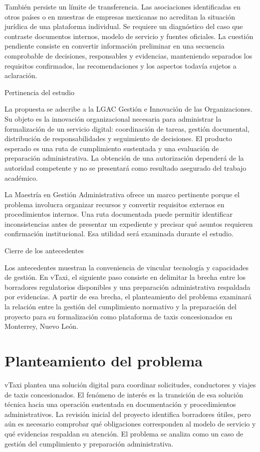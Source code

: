 {También persiste un límite de transferencia. Las asociaciones identificadas en otros países o en muestras de empresas mexicanas no acreditan la situación jurídica de una plataforma individual. Se requiere un diagnóstico del caso que contraste documentos internos, modelo de servicio y fuentes oficiales. La cuestión pendiente consiste en convertir información preliminar en una secuencia comprobable de decisiones, responsables y evidencias, manteniendo separados los requisitos confirmados, las recomendaciones y los aspectos todavía sujetos a aclaración.


Pertinencia del estudio


La propuesta se adscribe a la LGAC Gestión e Innovación de las Organizaciones. Su objeto es la innovación organizacional necesaria para administrar la formalización de un servicio digital: coordinación de tareas, gestión documental, distribución de responsabilidades y seguimiento de decisiones. El producto esperado es una ruta de cumplimiento sustentada y una evaluación de preparación administrativa. La obtención de una autorización dependerá de la autoridad competente y no se presentará como resultado asegurado del trabajo académico.


La Maestría en Gestión Administrativa ofrece un marco pertinente porque el problema involucra organizar recursos y convertir requisitos externos en procedimientos internos. Una ruta documentada puede permitir identificar inconsistencias antes de presentar un expediente y precisar qué asuntos requieren confirmación institucional. Esa utilidad será examinada durante el estudio.


Cierre de los antecedentes


Los antecedentes muestran la conveniencia de vincular tecnología y capacidades de gestión. En vTaxi, el siguiente paso consiste en delimitar la brecha entre los borradores regulatorios disponibles y una preparación administrativa respaldada por evidencias. A partir de esa brecha, el planteamiento del problema examinará la relación entre la gestión del cumplimiento normativo y la preparación del proyecto para su formalización como plataforma de taxis concesionados en Monterrey, Nuevo León.


\section{Planteamiento del problema}
vTaxi plantea una solución digital para coordinar solicitudes, conductores y viajes de taxis concesionados. El fenómeno de interés es la transición de esa solución técnica hacia una operación sustentada en documentación y procedimientos administrativos. La revisión inicial del proyecto identifica borradores útiles, pero aún es necesario comprobar qué obligaciones corresponden al modelo de servicio y qué evidencias respaldan su atención. El problema se analiza como un caso de gestión del cumplimiento y preparación administrativa.


}
